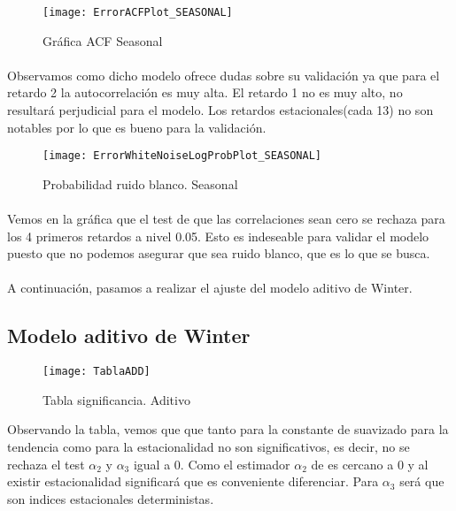 \documentclass[a4paper, spanish]{article}
\begin{document}
      \begin{figure}[h]
        \centering
        \texttt{[image: ErrorACFPlot\_SEASONAL]}
        \caption{Gráfica ACF Seasonal}
        \label{}
      \end{figure}

      \paragraph{}
      Observamos como dicho modelo ofrece dudas sobre su validación ya que para el retardo 2 la autocorrelación es muy alta. El retardo 1 no es muy alto, no resultará perjudicial para el modelo. Los retardos estacionales(cada 13) no son notables por lo que es bueno para la validación.

      \begin{figure}[h]
        \centering
        \texttt{[image: ErrorWhiteNoiseLogProbPlot\_SEASONAL]}
        \caption{Probabilidad ruido blanco. Seasonal}
        \label{}
      \end{figure}

      \paragraph{}
      Vemos en la gráfica que el test de que las correlaciones sean cero se rechaza para los 4 primeros retardos a nivel 0.05. Esto es indeseable para validar el modelo puesto que no podemos asegurar que sea ruido blanco, que es lo que se busca.

      \paragraph{}
      A continuación, pasamos a realizar el ajuste del modelo aditivo de Winter.

    \subsection{Modelo aditivo de Winter}


      \begin{figure}[h]
        \centering
        \texttt{[image: TablaADD]}
        \caption{Tabla significancia. Aditivo}
        \label{}
      \end{figure}

      Observando la tabla, vemos que que tanto para la constante de suavizado para la tendencia como para la estacionalidad no son significativos, es decir, no se rechaza el test $\alpha_2$ y $\alpha_3$ igual a 0. Como el estimador $\alpha_2$ de es cercano a 0 y al existir estacionalidad significará que es conveniente diferenciar. Para $\alpha_3$ será que son indices estacionales deterministas.
\end{document}

